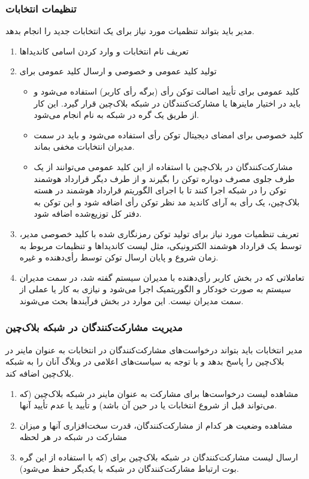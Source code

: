 \documentclass[12pt]{article}
\begin{document}
\subsubsection{تنظیمات انتخابات}
مدیر باید بتواند تنظمیات مورد نیاز برای یک انتخابات جدید را انجام بدهد. 
\begin{enumerate}[label=(\arabic*)]
\item
تعریف نام انتخابات و وارد کردن اسامی کاندیداها 
\item
تولید کلید عمومی و خصوصی و ارسال کلید عمومی برای 
\begin{itemize}
\item
کلید عمومی برای تأیید اصالت توکن رأی (برگه رأی کاربر) استفاده می‌شود و باید در اختیار ماینرها یا مشارکت‌کنند‌گان در شبکه بلاک‌چین قرار ‌گیرد. این کار از طریق یک گره در شبکه به نام 
انجام می‌شود. 
\item
کلید خصوصی برای امضای دیجیتال توکن رأی استفاده می‌شود و باید در سمت مدیران انتخابات مخفی بماند. 
\item
مشارکت‌کنندگان در بلاک‌چین با استفاده از این کلید عمومی می‌توانند از یک طرف جلوی مصرف دوباره توکن را بگیرند و از طرف دیگر قرارداد هوشمند توکن را در شبکه اجرا کنند تا با اجرای  الگوریتم قرارداد هوشمند در هسته بلاک‌چین، یک رأی به آرای کاندید مد نظر توکن رأی اضافه شود و این توکن به دفتر کل توزیع‌شده اضافه شود.
\end{itemize}
\item
تعریف تنظمیات مورد نیاز برای تولید توکن رمزنگاری شده با کلید خصوصی مدیر، توسط یک قرارداد هوشمند الکترونیکی، مثل لیست کاندیداها و تنظیمات مربوط به زمان شروع و پایان ارسال توکن توسط رأی‌دهنده و غیره.  
\item
تعاملاتی که در بخش کاربر رأی‌دهنده با مدیران سیستم گفته شد، در سمت مدیران سیستم به صورت خودکار و الگوریتمیک اجرا می‌شود و نیازی به کار یا عملی از سمت مدیران نیست. این موارد در بخش فرآیندها بحث می‌شوند. 
\end{enumerate}



\subsubsection{مدیریت مشارکت‌کنند‌گان در شبکه بلاک‌چین}
مدیر انتخابات باید بتواند درخواست‌های مشارکت‌کنند‌گان در انتخابات به عنوان ماینر در بلاک‌چین را پاسخ بدهد و با توجه به سیاست‌های اعلامی در وبلاگ آنان را به شبکه بلاک‌چین اضافه کند. 
\begin{enumerate}[label=(\arabic*)]
\item
مشاهده لیست درخواست‌ها برای مشارکت به عنوان ماینر در شبکه بلاک‌چین (که می‌تواند قبل از شروع انتخابات یا در حین آن باشد) و تأیید یا عدم تأیید آنها. 
\item
مشاهده وضعیت هر کدام از مشارکت‌کنند‌گان، قدرت سخت‌افزاری آنها و میزان مشارکت در شبکه در هر لحظه
\item
ارسال لیست مشارکت‌کنند‌گان در شبکه بلاک‌چین برای 
(که با استفاده از این گره بوت ارتباط‌ مشارکت‌کنندگان در شبکه با یکدیگر حفظ می‌شود). 
\end{enumerate}
\end{document}
